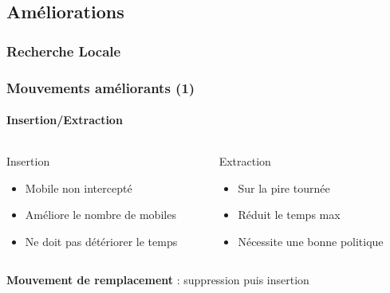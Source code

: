 \subsection{Améliorations}
\begin{frame}
	\frametitle{Recherche Locale}
\end{frame}
\begin{frame}
	\frametitle{Mouvements améliorants (1)}
	\framesubtitle{Insertion/Extraction}
	\begin{columns}
		\begin{column}{.53\linewidth}
			\begin{block}{Insertion}
				\centering
				\begin{tikzpicture}[scale=.7,schema,transform shape,thick]
					
				\end{tikzpicture}
			\end{block}
			\begin{itemize}
				\item Mobile non intercepté
				\item Améliore le nombre de mobiles
				\item Ne doit pas détériorer le temps
			\end{itemize}
		\end{column}
		\begin{column}{.53\linewidth}
			\begin{block}{Extraction}
				\centering
				\begin{tikzpicture}[scale=.7,schema,transform shape,thick]
					
				\end{tikzpicture}
			\end{block}
			\begin{itemize}
				\item Sur la pire tournée
				\item Réduit le temps max
				\item Nécessite une bonne politique
			\end{itemize}
		\end{column}
	\end{columns}
	\vspace*{2em}
	\textbf{Mouvement de remplacement} : suppression puis insertion
\end{frame}
